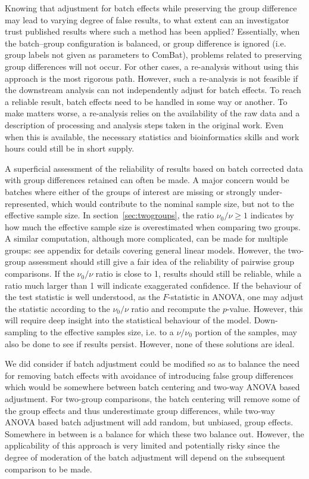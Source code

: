 \documentclass{bio}
\begin{document}
Knowing that adjustment for batch effects while preserving the group difference may lead to varying degree of false results, to what extent can an investigator trust published results where such a method has been applied? Essentially, when the batch--group configuration is balanced, or group difference is ignored  (i.e. group labels not given as parameters to ComBat), problems related to preserving group differences will not occur. For other cases, a re-analysis without using this approach is the most rigorous path. However, such a re-analysis is not feasible if the downstream  analysis can not independently adjust for batch effects. To reach a reliable result, batch effects need to be handled in some way or another. To make matters worse, a re-analysis relies on the availability of the raw data and a description of processing and analysis steps taken in the original work. Even when this is available, the necessary statistics and bioinformatics skills and work hours could still be in short supply.

A superficial assessment of the reliability of results based on batch corrected data with group differences retained can often be made. A major concern would be batches where either of the groups of interest are missing or strongly under-represented, which would contribute to the nominal sample size, but not to the effective sample size. In section~\ref{sec:twogroups}, the ratio $\nu_0/\nu\ge1$ indicates by how much the effective sample size is overestimated when comparing two groups. A similar computation, although more complicated, can be made for multiple groups: see appendix for details covering general linear models. However, the two-group assessment should still give a fair idea of the reliability of pairwise group comparisons. If the $\nu_0/\nu$ ratio is close to 1, results should still be reliable, while a ratio much larger than 1 will indicate exaggerated confidence. If the behaviour of the test statistic is well understood, as the $F$-statistic in ANOVA, one may adjust the statistic according to the $\nu_0/\nu$ ratio and recompute the $p$-value. However, this will require deep insight into the statistical behaviour of the model. Down-sampling to the effective samples size, i.e. to a $\nu/\nu_0$ portion of the samples, may also be done to see if results persist. However, none of these solutions are ideal.

We did consider if batch adjustment could be modified so as to balance the need for removing batch effects with avoidance of introducing false group differences which would be somewhere between batch centering and two-way ANOVA based adjustment. For two-group comparisons, the batch centering will remove some of the group effects and thus underestimate group differences, while two-way ANOVA based batch adjustment will add random, but unbiased, group effects. Somewhere in between is a balance for which these two balance out. However, the applicability of this approach is very limited and potentially risky since the degree of moderation of the batch adjustment will depend on the subsequent comparison to be made.
\end{document}
